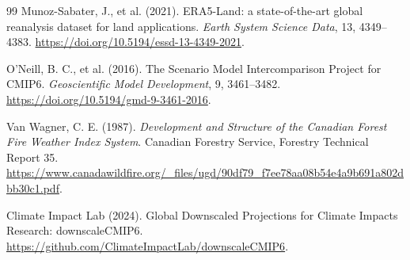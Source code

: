\documentclass[11pt]{article}
\begin{document}
\begin{thebibliography}{99}
Munoz-Sabater, J., et al. (2021).
ERA5-Land: a state-of-the-art global reanalysis dataset for land applications.
\emph{Earth System Science Data}, 13, 4349--4383.
\url{https://doi.org/10.5194/essd-13-4349-2021}.

O'Neill, B. C., et al. (2016).
The Scenario Model Intercomparison Project for CMIP6.
\emph{Geoscientific Model Development}, 9, 3461--3482.
\url{https://doi.org/10.5194/gmd-9-3461-2016}.

Van Wagner, C. E. (1987).
\emph{Development and Structure of the Canadian Forest Fire Weather Index
System}. Canadian Forestry Service, Forestry Technical Report 35.
\url{https://www.canadawildfire.org/_files/ugd/90df79_f7ee78aa08b54e4a9b691a802dbb30c1.pdf}.

Climate Impact Lab (2024).
Global Downscaled Projections for Climate Impacts Research: downscaleCMIP6.
\url{https://github.com/ClimateImpactLab/downscaleCMIP6}.

\end{thebibliography}
\end{document}
